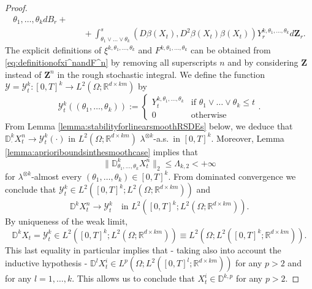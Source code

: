 \documentclass[11pt,a4paper]{article}
\theoremstyle{plain}
\begin{document}
\begin{proof}
\begin{align*}
{    \theta_1, \ldots, \theta_k} d B_r +\\
    & \quad  + \int_{\theta_1 \vee \dots \vee \theta_k}^s (D \beta (X_t), D^2
    \beta (X_t) \beta (X_t)) Y_r^{k, \theta_1, \ldots, \theta_k} d
    \mathbf{Z}_r . 
  \end{align*}
  The explicit definitions of $\xi^{k, \theta_1, \ldots, \theta_k}$ and $F^{k, \theta_1, \ldots, \theta_k}$ can be obtained from \eqref{eq:definitionofxi^nandF^n} by removing all superscripts $n$ and by considering $\mathbf{Z}$ instead of $\mathbf{Z}^n$ in the rough stochastic integral. 
  We define the function $\mathcal{Y}=\mathcal{Y}^{k}_t : [0,
  T]^k \rightarrow L^2 (\Omega ; \mathbb{R}^{d \times km})$ by \begin{equation*}
      \mathcal{Y}^k_t ((\theta_1, \ldots, \theta_k)) := \begin{cases}
          Y^{k, \theta_1,
     \ldots, \theta_k}_t & \text{if $\theta_1\vee\dots\vee\theta_k \le t$} \\
     0 & \text{otherwise}
      \end{cases}.
  \end{equation*}
  From Lemma \ref{lemma:stabilityforlinearsmoothRSDEs} below, we deduce that 
  $\mathbb{D}_{\cdot}^k X_t^n \to \mathcal{Y}^k_t (\cdot)$ in $L^2
  (\Omega ; \mathbb{R}^{d \times km})$ $\lambda^{\otimes k}$-a.s.\ in $[0,T]^k$. Moreover, Lemma \ref{lemma:aprioriboundsinthesmoothcase} implies that \begin{equation*}
      \| \mathbb{D}_{\theta_1, \ldots, \theta_k}^k X_t^n \|_2 \le
     \Lambda_{k, 2} < +\infty
  \end{equation*}
  for $\lambda^{\otimes k}$-almost every $(\theta_1, \ldots, \theta_k) \in [0,T]^k$.
  From dominated convergence we conclude that $\mathcal{Y}^k_t \in
  L^2 ([0, T]^k ; L^2 (\Omega ; \mathbb{R}^{d \times km}))$ and \begin{equation*}
      \mathbb{D}^k X_t^n \rightarrow \mathcal{Y}^k_t \quad \text{in $L^2 ([0, T]^k ;
  L^2 (\Omega ; \mathbb{R}^{d \times km}))$}.
  \end{equation*}  
  By uniqueness of the weak limit, \begin{equation*}
      \mathbb{D}^k X_t =\mathcal{Y}^k_t \in L^2 ([0, T]^k ; L^2
     (\Omega ; \mathbb{R}^{d \times km})) \equiv L^2
     (\Omega ; L^2 ([0, T]^k ; \mathbb{R}^{d \times km})) .
  \end{equation*}
  This last equality in particular implies that - taking also into account the
  inductive hypothesis - $\mathbb{D}^l X_t^i \in L^p (\Omega ; L^2 ([0, T]^l ; \mathbb{R}^{d \times km}))$ for any $p > 2$ and for
  any $l = 1, \dots, k$. This allows us to conclude that $X_t^i \in
  \mathbb{D}^{k, p}$ for any $p > 2$.
\end{proof}
\end{document}
